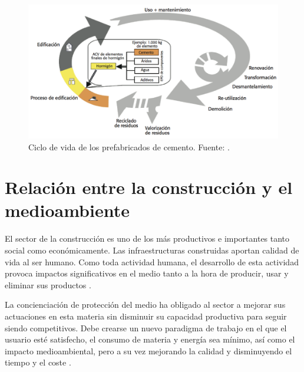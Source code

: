 \begin{figure}[!htb]
\centering
\includegraphics[width=12cm]{ciclodevida.png}
\caption[Ciclo de vida de los prefabricados de cemento.]{Ciclo de vida de los prefabricados de cemento. Fuente: \cite{oficemen}.}
\label{fig:ciclodevidaprefabric}
\end{figure}

\section{Relación entre la construcción y el medioambiente}
El sector de la construcción es uno de los más productivos e importantes tanto social como económicamente. Las infraestructuras construidas aportan calidad de vida al ser humano. Como toda actividad humana, el desarrollo de esta actividad provoca impactos significativos en el medio tanto a la hora de producir, usar y eliminar sus productos \cite{carvalho}.

La concienciación de protección del medio ha obligado al sector a mejorar sus actuaciones en esta materia sin disminuir su capacidad productiva para seguir siendo competitivos. Debe crearse un nuevo paradigma de trabajo en el que el usuario esté satisfecho, el consumo de materia y energía sea mínimo, así como el impacto medioambiental, pero a su vez mejorando la calidad y disminuyendo el tiempo y el coste \cite{augenbroe}.

